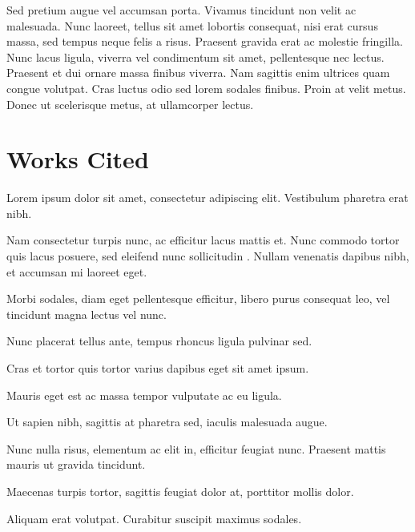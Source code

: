 \documentclass[a4paper]{memoir}
\begin{document}
Sed pretium augue vel accumsan porta. Vivamus tincidunt non velit ac malesuada. Nunc laoreet, tellus sit amet lobortis consequat, nisi erat cursus massa, sed tempus neque felis a risus. Praesent gravida erat ac molestie fringilla. Nunc lacus ligula, viverra vel condimentum sit amet, pellentesque nec lectus. Praesent et dui ornare massa finibus viverra. Nam sagittis enim ultrices quam congue volutpat. Cras luctus odio sed lorem sodales finibus. Proin at velit metus. Donec ut scelerisque metus, at ullamcorper lectus. 


\backmatter
\chapter*{Works Cited}
\label{workscited}

Lorem ipsum dolor sit amet, consectetur adipiscing elit. Vestibulum pharetra erat nibh.

Nam consectetur turpis nunc, ac efficitur lacus mattis et. Nunc commodo tortor quis lacus posuere, sed eleifend nunc sollicitudin
.
Nullam venenatis dapibus nibh, et accumsan mi laoreet eget. 

Morbi sodales, diam eget pellentesque efficitur, libero purus consequat leo, vel tincidunt magna lectus vel nunc. 

Nunc placerat tellus ante, tempus rhoncus ligula pulvinar sed. 

Cras et tortor quis tortor varius dapibus eget sit amet ipsum. 

Mauris eget est ac massa tempor vulputate ac eu ligula. 

Ut sapien nibh, sagittis at pharetra sed, iaculis malesuada augue. 

Nunc nulla risus, elementum ac elit in, efficitur feugiat nunc. Praesent mattis mauris ut gravida tincidunt. 

Maecenas turpis tortor, sagittis feugiat dolor at, porttitor mollis dolor. 

Aliquam erat volutpat. Curabitur suscipit maximus sodales.

\end{document}
